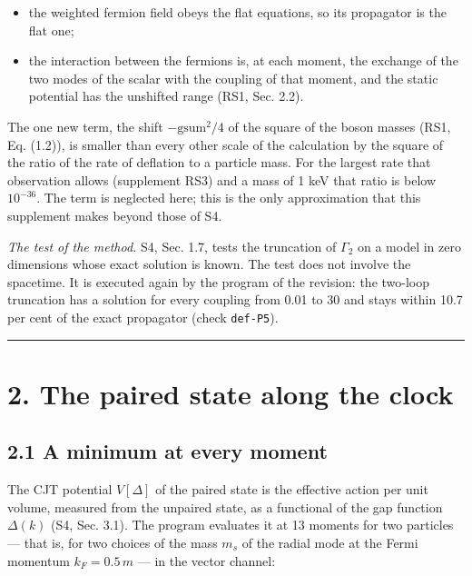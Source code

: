 \documentclass[
  10pt,
]{article}
\providecommand{\tightlist}{%
  \setlength{\itemsep}{0pt}\setlength{\parskip}{0pt}}
\begin{document}
\begin{itemize}
\tightlist
\item
  the weighted fermion field obeys the flat equations, so its propagator
  is the flat one;
\item
  the interaction between the fermions is, at each moment, the exchange
  of the two modes of the scalar with the coupling of that moment, and
  the static potential has the unshifted range (RS1, Sec. 2.2).
\end{itemize}

The one new term, the shift \(-\mathrm{gsum}^2/4\) of the square of the
boson masses (RS1, Eq. (1.2)), is smaller than every other scale of the
calculation by the square of the ratio of the rate of deflation to a
particle mass. For the largest rate that observation allows (supplement
RS3) and a mass of 1 keV that ratio is below \(10^{-36}\). The term is
neglected here; this is the only approximation that this supplement
makes beyond those of S4.

\emph{The test of the method.} S4, Sec. 1.7, tests the truncation of
\(\Gamma_2\) on a model in zero dimensions whose exact solution is
known. The test does not involve the spacetime. It is executed again by
the program of the revision: the two-loop truncation has a solution for
every coupling from 0.01 to 30 and stays within 10.7 per cent of the
exact propagator (check \texttt{def-P5}).

\begin{center}\rule{0.5\linewidth}{0.5pt}\end{center}

\hypertarget{the-paired-state-along-the-clock}{%
\section{2. The paired state along the
clock}\label{the-paired-state-along-the-clock}}

\hypertarget{a-minimum-at-every-moment}{%
\subsection{2.1 A minimum at every
moment}\label{a-minimum-at-every-moment}}

The CJT potential \(V[\Delta]\) of the paired state is the effective
action per unit volume, measured from the unpaired state, as a
functional of the gap function \(\Delta(k)\) (S4, Sec. 3.1). The program
evaluates it at 13 moments for two particles --- that is, for two
choices of the mass \(m_s\) of the radial mode at the Fermi momentum
\(k_F=0.5\,m\) --- in the vector channel:
\end{document}
